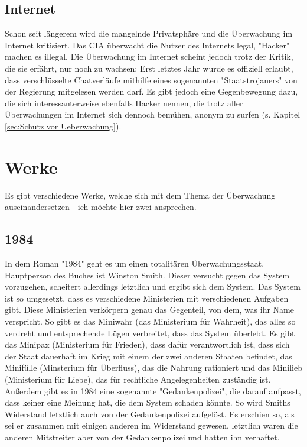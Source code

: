 \documentclass{article}
\begin{document}
\subsection{Internet\autocite{Internet}}
Schon seit längerem wird die mangelnde Privatsphäre und die Überwachung im Internet kritisiert. Das CIA überwacht die Nutzer des Internets legal, "Hacker" machen es illegal. Die Überwachung im Internet scheint jedoch trotz der Kritik, die sie erfährt, nur noch zu wachsen: Erst letztes Jahr wurde es offiziell erlaubt, dass verschlüsselte Chatverläufe mithilfe eines sogenannten "Staatstrojaners" von der Regierung mitgelesen werden darf. Es gibt jedoch eine Gegenbewegung dazu, die sich interessanterweise ebenfalls Hacker nennen, die trotz aller Überwachungen im Internet sich dennoch bemühen, anonym zu surfen (s. Kapitel \ref{sec:Schutz vor Ueberwachung}).

\section{Werke}
Es gibt verschiedene Werke, welche sich mit dem Thema der Überwachung auseinandersetzen - ich möchte hier zwei ansprechen.

\subsection{1984\autocite{1984}}
\label{subsec:1984}
In dem Roman "1984" geht es um einen totalitären Überwachungsstaat. Hauptperson des Buches ist Winston Smith. Dieser versucht gegen das System vorzugehen, scheitert allerdings letztlich und ergibt sich dem System.
Das System ist so umgesetzt, dass es verschiedene Ministerien mit verschiedenen Aufgaben gibt. Diese Ministerien verkörpern genau das Gegenteil, von dem, was ihr Name verspricht. So gibt es das Miniwahr (das Ministerium für Wahrheit), das alles so verdreht und entsprechende Lügen verbreitet, dass das System überlebt. Es gibt das Minipax (Ministerium für Frieden), dass dafür verantwortlich ist, dass sich der Staat dauerhaft im Krieg mit einem der zwei anderen Staaten befindet, das Minifülle (Minsterium für Überfluss), das die Nahrung rationiert und das Minilieb (Ministerium für Liebe), das für rechtliche Angelegenheiten zuständig ist. Außerdem gibt es in 1984 eine sogenannte "Gedankenpolizei", die darauf aufpasst, dass keiner eine Meinung hat, die dem System schaden könnte. So wird Smiths Widerstand letztlich auch von der Gedankenpolizei aufgelöst. Es erschien so, als sei er zusammen mit einigen anderen im Widerstand gewesen, letztlich waren die anderen Mitstreiter aber von der Gedankenpolizei und hatten ihn verhaftet.
\end{document}
